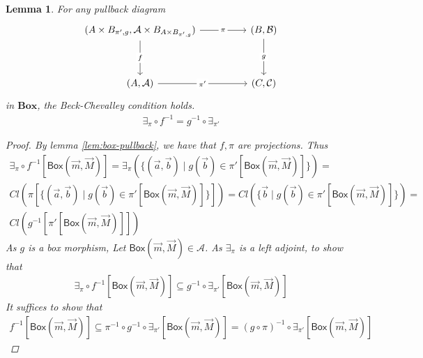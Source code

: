 \documentclass[12pt]{article}
\newtheorem{lemma}[theorem]{Lemma}
\newcommand{\bobject}{\mathsf{Box}}
\begin{document}
\begin{lemma}
    For any pullback diagram
    \[\begin{tikzcd}
        {(A\times B_{\pi',g},\mathcal{A}\times B_{A\times B_{\pi',g}})} && {(B,\mathcal{B})} \\
        \\
        {(A,\mathcal{A})} && {(C,\mathcal{C})}
        \arrow["\pi"{description}, from=1-1, to=1-3]
        \arrow["g"{description}, from=1-3, to=3-3]
        \arrow["f"{description}, from=1-1, to=3-1]
        \arrow["{\pi'}"{description}, from=3-1, to=3-3]
    \end{tikzcd}\]
    in $\mathbf{Box}$, the Beck-Chevalley condition holds.
    \begin{gather*}
        \exists_\pi\circ f^{-1}=g^{-1}\circ\exists_{\pi'}
    \end{gather*}
    \begin{proof}
        By lemma \ref{lem:box-pullback}, we have that $f,\pi$ are projections.
        Thus
        \begin{gather*}
            \exists_\pi\circ f^{-1}[\bobject(\vec{m},\vec{M})]=
            \exists_\pi(\{(\vec{a},\vec{b})\mid g(\vec{b})\in \pi'[\bobject(\vec{m},\vec{M})]\})=
            \\
            Cl(\pi[\{(\vec{a},\vec{b})\mid g(\vec{b})\in \pi'[\bobject(\vec{m},\vec{M})]\}])
            =
            Cl(\{\vec{b}\mid g(\vec{b})\in \pi'[\bobject(\vec{m},\vec{M})]\})=
            \\
            Cl(g^{-1}[\pi'[\bobject(\vec{m},\vec{M})]])
        \end{gather*}
        As $g$ is a box morphism,
        Let $\bobject(\vec{m},\vec{M})\in\mathcal{A}$.
        As $\exists_\pi$ is a left adjoint, to show that
        \begin{gather*}
            \exists_\pi\circ f^{-1}[\bobject(\vec{m},\vec{M})]
            \subseteq
            g^{-1}\circ\exists_{\pi'}[\bobject(\vec{m},\vec{M})]
        \end{gather*}
        It suffices to show that
        \begin{gather*}
            f^{-1}[\bobject(\vec{m},\vec{M})]
            \subseteq
            \pi^{-1}\circ g^{-1}\circ\exists_{\pi'}[\bobject(\vec{m},\vec{M})]=(g\circ\pi)^{-1}\circ\exists_{\pi'}[\bobject(\vec{m},\vec{M})]
        \end{gather*}

\end{proof}
\end{lemma}
\end{document}
